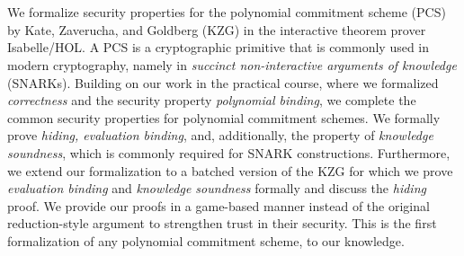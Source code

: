 \chapter{\abstractname}

We formalize security properties for the polynomial commitment scheme (PCS) by Kate, Zaverucha, and Goldberg (KZG) in the interactive theorem prover Isabelle/HOL. A PCS is a cryptographic primitive that is commonly used in modern cryptography, namely in \textit{succinct non-interactive arguments of knowledge} (SNARKs). 
Building on our work in the practical course, where we formalized \textit{correctness} and the security property \textit{polynomial binding}, we complete the common security properties for polynomial commitment schemes. We formally prove \textit{hiding, evaluation binding}, and, additionally, the property of \textit{knowledge soundness}, which is commonly required for SNARK constructions.
Furthermore, we extend our formalization to a batched version of the KZG for which we prove \textit{evaluation binding} and \textit{knowledge soundness} formally and discuss the \textit{hiding} proof.
We provide our proofs in a game-based manner instead of the original reduction-style argument to strengthen trust in their security.
This is the first formalization of any polynomial commitment scheme, to our knowledge. 